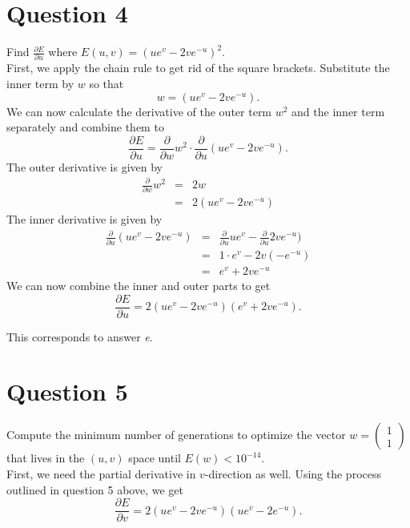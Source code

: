 \documentclass[	11pt,
				a4paper,
				twoside,
				titlepage,
				bibtotoc,
				openright,
				cleardoublepage=empty
				]{scrartcl}
\begin{document}
\section{Question 4} %

Find $\frac{\partial{E}}{\partial{u}}$ where $E(u,v) = (ue^v - 2ve^{-u})^2$.\\

First, we apply the chain rule to get rid of the square brackets. Substitute the inner term by $w$ so that
\begin{equation}
w = (ue^v - 2ve^{-u}).
\end{equation}
We can now calculate the derivative of the outer term $w^2$ and the inner term separately and combine them to
\begin{equation}
\frac{\partial{E}}{\partial{u}} = \frac{\partial}{\partial{w}}w^2 \cdot \frac{\partial{}}{\partial{u}}(ue^v - 2ve^{-u}).
\end{equation}
The outer derivative is given by
\begin{eqnarray}
\frac{\partial}{\partial{w}}w^2 & = & 2w\\[10pt]
								& = & 2(ue^v - 2ve^{-u})
\end{eqnarray}
The inner derivative is given by
\begin{eqnarray}
\frac{\partial{}}{\partial{u}}(ue^v - 2ve^{-u})	& = &\frac{\partial{}}{\partial{u}} ue^v - \frac{\partial{}}{\partial{u}} 2ve^{-u})\\[10pt]
												& = &1\cdot e^v - 2v(-e^{-u})\\[10pt]
												& = & e^v + 2ve^{-u}
\end{eqnarray}
We can now combine the inner and outer parts to get
\begin{equation}
\frac{\partial{E}}{\partial{u}} = 2(ue^v - 2ve^{-u})(e^v + 2ve^{-u}).
\end{equation}

This corresponds to answer \emph{e}.





\section{Question 5} %
Compute the minimum number of generations to optimize the vector $w = \left(\begin{smallmatrix}1\\1\end{smallmatrix}\right)$ that lives in the $(u,v)$ space until $E(w) < 10^{-14}$.\\
First, we need the partial derivative in $v$-direction as well. Using the process outlined in question 5 above, we get
\begin{equation}
\frac{\partial{E}}{\partial{v}} = 2(ue^v - 2ve^{-u})(ue^v - 2e^{-u}).
\end{equation}
\end{document}
